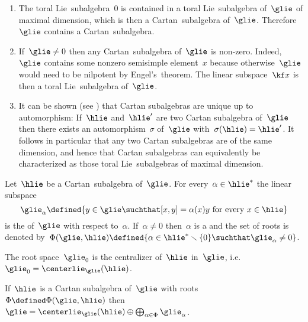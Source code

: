\begin{remark}
  \leavevmode
  \begin{enumerate}
    \item
      The toral Lie~subalgebra~$0$ is contained in a toral Lie~subalgebra of~$\glie$ of maximal dimension, which is then a Cartan~subalgebra of~$\glie$.
      Therefore~$\glie$ contains a Cartan~subalgebra.
    \item
      If~$\glie \neq 0$ then any Cartan~subalgebra of~$\glie$ is non-zero.
      Indeed,~$\glie$ contains some nonzero semisimple element~$x$ because otherwise~$\glie$ would need to be nilpotent by Engel’s~theorem.
      The linear subspace~$\kf x$ is then a toral Lie~subalgebra of~$\glie$.
    \item
      It can be shown (see \cite[\S 16.2]{humphreys}) that Cartan subalgebras are unique up to automorphism:
      If~$\hlie$ and~$\hlie'$ are two Cartan subalgebra of~$\glie$ then there exists an automorphism~$\sigma$ of~$\glie$ with~$\sigma(\hlie) = \hlie'$.
      It follows in particular that any two Cartan subalgebras are of the same dimension, and hence that Cartan subalgebras can equivalently be characterized as those toral Lie~subalgebras of maximal dimension.
  \end{enumerate}
\end{remark}


\begin{definition}
  Let~$\hlie$ be a Cartan~subalgebra of~$\glie$.
  For every~$\alpha \in \hlie^*$ the linear subspace
  \[
    \glie_\alpha
    \defined
    \{
      y \in \glie
    \suchthat
      \text{$[x,y] = \alpha(x)y$ for every~$x \in \hlie$}
    \}
  \]
  is the  of~$\glie$ with respect to~$\alpha$.
  If~$\alpha \neq 0$ then~$\alpha$ is a  and the set of roots is denoted by~$\Phi(\glie, \hlie) \defined \{\alpha \in \hlie^* \smallsetminus \{0\} \suchthat \glie_\alpha \neq 0\}$.
\end{definition}


\begin{remark}
  The root space~$\glie_0$ is the centralizer of~$\hlie$ in~$\glie$, i.e.~$\glie_0 = \centerlie_{\glie}(\hlie)$.
\end{remark}


\begin{lemma}
  \label{pre root space decomposition}
  If~$\hlie$ is a Cartan subalgebra of~$\glie$ with roots~$\Phi \defined \Phi(\glie, \hlie)$ then~$\glie = \centerlie_{\glie}(\hlie) \oplus \bigoplus_{\alpha \in \Phi} \glie_\alpha$.
\end{lemma}


